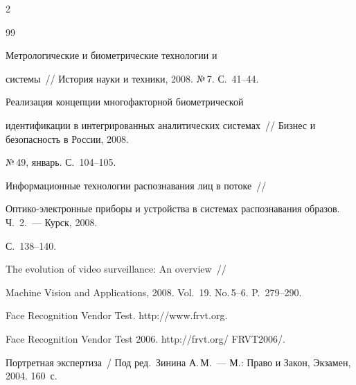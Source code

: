 \begin{multicols}{2}
{{\begin{thebibliography}{99}




Метрологические и биометрические технологии и


системы~// История науки и техники, 2008.  №\,7. С.~41--44.









Реализация концепции многофакторной биометрической 


идентификации в интегрированных аналитических системах~// Бизнес и безопасность в России, 2008.


№\,49, январь. С.~104--105.









Информационные технологии распознавания лиц в потоке~// 


Оптико-элек\-трон\-ные приборы и устройства в системах распознавания образов. Ч.~2.~--- Курск, 2008. 


С.~138--140.









The evolution of video surveillance: An overview~// 


Machine Vision and Applications, 2008. Vol.~19. No.\,5--6. P.~279--290.







Face Recognition Vendor Test. {\sf http://www.frvt.org}.







Face Recognition Vendor Test  2006. {\sf http://frvt.org/ FRVT2006/}.







Портретная экспертиза~/ Под ред.\ Зинина А.\,М.~---  М.: Право и Закон, Экзамен, 2004. 160~с.






\end{thebibliography}}}
\end{multicols}
